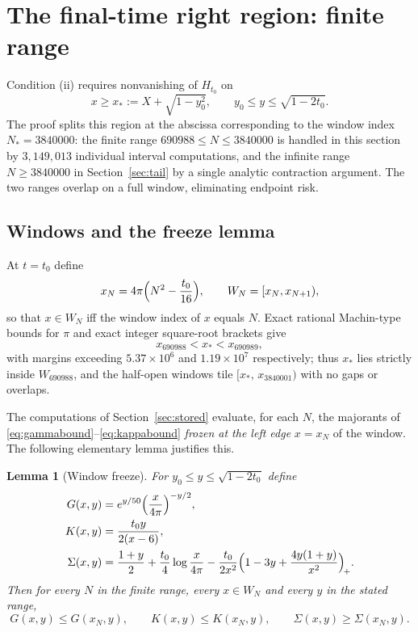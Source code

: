 \documentclass[11pt]{article}
\newtheorem{lemma}[theorem]{Lemma}
\theoremstyle{definition}
\begin{document}
\section{The final-time right region: finite range}\label{sec:finite}

Condition (ii) requires nonvanishing of $H_{t_0}$ on
\begin{equation}\label{eq:hypiiregion}
x\ge x_*:=X+\sqrt{1-y_0^2},
\qquad
y_0\le y\le\sqrt{1-2t_0}.
\end{equation}
The proof splits this region at the abscissa corresponding to
the window index $N_*=3840000$: the finite range
$690988\le N\le3840000$ is handled in this section by
$3{,}149{,}013$ individual interval computations, and
the infinite range $N\ge3840000$ in Section~\ref{sec:tail} by a
single analytic contraction argument. The two ranges overlap on a
full window, eliminating endpoint risk.

\subsection{Windows and the freeze lemma}\label{sec:freeze}

At $t=t_0$ define
\[
x_N=4\pi\Bigl(N^2-\frac{t_0}{16}\Bigr),
\qquad
W_N=[x_N,x_{N+1}),
\]
so that $x\in W_N$ iff the window index of $x$ equals $N$. Exact
rational Machin-type bounds for $\pi$ and exact integer square-root
brackets give
\begin{equation}\label{eq:xstarwindow}
x_{690988}<x_*<x_{690989},
\end{equation}
with margins exceeding $5.37\times10^6$ and $1.19\times10^7$
respectively; thus $x_*$ lies strictly inside $W_{690988}$, and the
half-open windows tile $[x_*,\,x_{3840001})$ with no gaps or overlaps.

The computations of Section~\ref{sec:stored} evaluate, for each
$N$, the majorants of
\eqref{eq:gammabound}--\eqref{eq:kappabound} \emph{frozen at the
left edge} $x=x_N$ of the window.
The following elementary lemma justifies this.

\begin{lemma}[Window freeze]\label{lem:freeze}
For $y_0\le y\le\sqrt{1-2t_0}$ define
\begin{align*}
G(x,y) &= e^{y/50}\Bigl(\frac{x}{4\pi}\Bigr)^{-y/2},
\\
K(x,y) &= \frac{t_0y}{2(x-6)},
\\
\Sigma(x,y) &= \frac{1+y}{2}+\frac{t_0}{4}\log\frac{x}{4\pi}
-\frac{t_0}{2x^2}\Bigl(1-3y+\frac{4y(1+y)}{x^2}\Bigr)_{\!+}.
\end{align*}
Then for every $N$ in the finite range, every $x\in W_N$ and every $y$
in the stated range,
\[
G(x,y)\le G(x_N,y),\qquad
K(x,y)\le K(x_N,y),\qquad
\Sigma(x,y)\ge\Sigma(x_N,y).
\]
\end{lemma}
\end{document}
